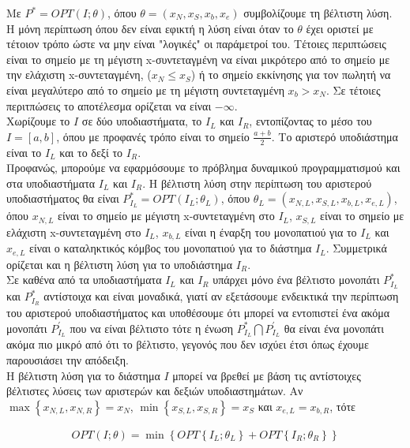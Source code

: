 \documentclass[oneside,12pt]{book}
\theoremstyle{definition}
\begin{document}
Με \(P^* = OPT(I;θ)\), όπου \(θ = (x_N, x_S, x_b, x_e)\) συμβολίζουμε τη βέλτιστη λύση. \\
Η μόνη περίπτωση όπου δεν είναι εφικτή η λύση είναι όταν το \(θ\) έχει οριστεί με τέτοιον τρόπο ώστε να μην είναι "λογικές" οι παράμετροί του. Τέτοιες περιπτώσεις είναι το σημείο με τη μέγιστη x-συντεταγμένη να είναι μικρότερο από το σημείο με την ελάχιστη x-συντεταγμένη, (\(x_N \leq x_S\)) ή το σημείο εκκίνησης για τον πωλητή να είναι μεγαλύτερο από το σημείο με τη μέγιστη συντεταγμένη \(x_b > x_N\). Σε τέτοιες περιτπώσεις το αποτέλεσμα ορίζεται να είναι \(- \infty\). \\
Χωρίζουμε το \(I\) σε δύο υποδιαστήματα, το \(I_L\) και \(I_R\), εντοπίζοντας το μέσο του \(I = [a,b]\), όπου με προφανές τρόπο είναι το σημείο \(\frac{a + b}{2}\). Το αριστερό υποδιάστημα είναι το \(I_L\) και το δεξί το \(I_R\). \\
Προφανώς, μπορούμε να εφαρμόσουμε το πρόβλημα δυναμικού προγραμματισμού και στα υποδιαστήματα \(I_L\) και \(I_R\). Η βέλτιστη λύση στην περίπτωση του αριστερού υποδιαστήματος θα είναι \(P^{*}_{I_L} = OPT(I_L;θ_L)\), όπου \(θ_L = (x_{N,L}, x_{S,L}, x_{b,L}, x_{e,L})\), όπου \(x_{N,L}\) είναι το σημείο με μέγιστη x-συντεταγμένη στο \(I_L\), \(x_{S,L}\) είναι το σημείο με ελάχιστη x-συντεταγμένη στο \(I_L\), \(x_{b,L}\) είναι η έναρξη του μονοπατιού για το \(I_L\) και \(x_{e,L}\) είναι ο καταληκτικός κόμβος του μονοπατιού για το διάστημα \(I_L\). Συμμετρικά ορίζεται και η βέλτιστη λύση για το υποδιάστημα \(I_R\). \\
Σε καθένα από τα υποδιαστήματα \(I_L\) και \(I_R\) υπάρχει μόνο ένα βέλτιστο μονοπάτι \(P^{*}_{I_L}\) και \(P^{*}_{I_R}\) αντίστοιχα και είναι μοναδικά, γιατί αν εξετάσουμε ενδεικτικά την περίπτωση του αριστερού υποδιαστήματος και υποθέσουμε ότι μπορεί να εντοπιστεί ένα ακόμα μονοπάτι \(P^{'}_{Ι_L}\) που να είναι βέλτιστο τότε η ένωση \(P^{*}_{Ι_L} \bigcap P^{'}_{Ι_L}\) θα είναι ένα μονοπάτι ακόμα πιο μικρό από ότι το βέλτιστο, γεγονός που δεν ισχύει έτσι όπως έχουμε παρουσιάσει την απόδειξη. \\
Η βέλτιστη λύση για το διάστημα \(Ι\) μπορεί να βρεθεί με βάση τις αντίστοιχες βέλτιστες λύσεις των αριστερών και δεξιών υποδιαστημάτων. Αν \(\max \left\{ x_{N,L}, x_{N,R} \right\} = x_N\), \(\min \left\{ x_{S,L}, x_{S,R} \right\} = x_S\) και \(x_{e,L} = x_{b,R}\), τότε

\begin{align*}
	OPT(I;θ) = \min \left\{ OPT\left\{ I_L;θ_L \right\} + OPT\left\{ I_R;θ_R \right\} \right\}
\end{align*}
\end{document}
